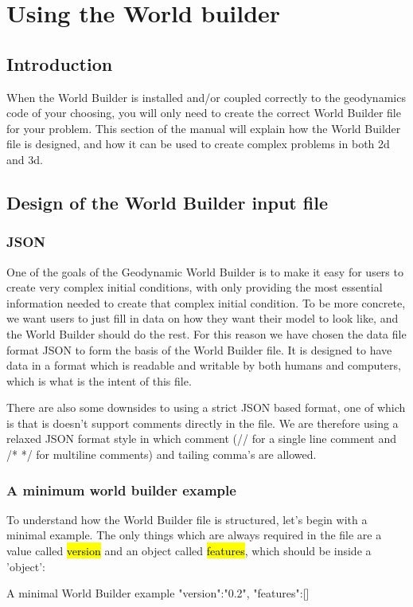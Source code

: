 \documentclass{book}
\newcommand{\GWB}{{Geodynamic World Builder}}
\newcommand{\WB}{{World Builder}}
\begin{document}
\chapter{Using the World builder}
\section{Introduction}
When the \WB{} is installed and/or coupled correctly to the geodynamics code of your choosing, you will only need to create the correct \WB{} file for your problem. This section of the manual will explain how the \WB{} file is designed, and how it can be used to create complex problems in both 2d and 3d. 
\section{Design of the \WB{} input file}
\subsection{JSON}
One of the goals of the \GWB{} is to make it easy for users to create very complex initial conditions, with only providing the most essential information needed to create that complex initial condition. To be more concrete, we want users to just fill in data on how they want their model to look like, and the \WB{} should do the rest. For this reason we have chosen the data file format JSON to form the basis of the \WB{} file. It is designed to have data in a format which is readable and writable by both humans and computers, which is what is the intent of this file. 
\begin{remark}
There are also some downsides to using a strict JSON based format, one of which is that is doesn't support comments directly in the file. We are therefore using a relaxed JSON format style in which comment (// for a single line comment and /* */ for multiline comments) and tailing comma's are allowed.
\end{remark}
\subsection{A minimum world builder example}
To understand how the \WB{} file is structured, let's begin with a minimal example. The only things which are always required in the file are a value called \hl{version} and an object called \hl{features}, which should be inside a 'object':

\begin{javascriptcode}{A minimal \WB{} example}{}
{
  "version":"0.2",
  "features":[]
}
\end{javascriptcode}
\end{document}

